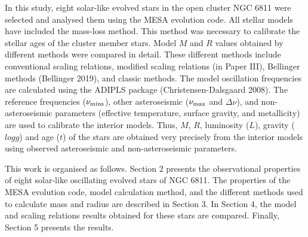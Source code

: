 \documentclass[a4paper,fleqn,usenatbib]{mnras}     %
\begin{document}
{In this study, eight solar-like evolved stars in the
 open cluster NGC 6811 were selected and analysed 
them using the {\small {MESA}} evolution code.
All stellar models have included the mass-loss method.
This method was necessary to calibrate
the stellar ages of the cluster member stars.
Model $M$ and $R$ values obtained by different methods
 were compared in detail. 
These different methods include 
conventional scaling relations, 
modified scaling relations (in Paper III), Bellinger methods (Bellinger 2019),
 and classic methods.
The model oscillation frequencies are calculated using 
the {\small {ADIPLS}} package (Christensen-Dalsgaard 2008).
The reference frequencies ($\nu _{\rm mins}$),
 other asteroseismic ($\nu _{\rm max}$ and $\Delta \nu$),
and non-asteroseismic parameters
(effective temperature, surface gravity, and
metallicity) are used to calibrate
the interior models.
Thus,
 $M$, $R$,
luminosity ($L$), gravity ($logg$)
and age ($t$) of the stars are obtained very precisely
from the interior models using observed 
asteroseismic and non-asteroseismic
 parameters.

This work is organised as follows. 
Section 2 presents
the observational properties of eight solar-like oscillating  evolved stars of NGC 6811.
The properties of the {\small {MESA}} evolution code, 
model calculation method, and the different methods used to calculate mass and radius are described in Section 3.
In Section 4, the model and scaling relations results obtained for these stars are compared.
Finally, Section 5 presents the results.

}
\end{document}
